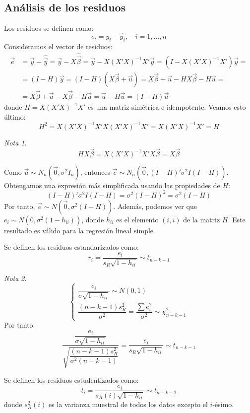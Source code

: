 \documentclass{report}
\theoremstyle{remark}
\theoremstyle{remark}
\newtheorem*{note}{Nota}
\theoremstyle{remark}
\theoremstyle{definition}
\theoremstyle{definition}
\theoremstyle{definition}
\begin{document}
\subsection*{Análisis de los residuos}
Los residuos se definen como:
$$e_i = y_i - \hat{y_i}, \quad i = 1, \dots, n$$
Consideramos el vector de residuos:
\begin{align*}
    \vec{e} & = \vec{y} - \hat{\vec{y}} = \vec{y} - X\hat{\vec{\beta}} = \vec{y} - X(X'X)^{-1}X'\vec{y} = (I - X(X'X)^{-1}X')\vec{y} = \\
            & = (I-H)\vec{y} = (I-H)(X\vec{\beta}+\vec{u}) = X\vec{\beta} + \vec{u} - HX\vec{\beta} - H\vec{u} =                       \\
            & = X\vec{\beta} + \vec{u} - X\vec{\beta} - H\vec{u} = \vec{u} - H\vec{u} = (I-H)\vec{u}
\end{align*}
donde $H = X(X'X)^{-1}X'$ es una matriz simétrica e idempotente.
Veamos esto último:
$$H^2 = X(X'X)^{-1}X'X(X'X)^{-1}X' = X(X'X)^{-1}X' = H$$

\begin{note}
    $$HX\vec{\beta} = X(X'X)^{-1}X'X\vec{\beta} = X\vec{\beta}$$
\end{note}

Como $\vec{u} \sim N_n(\vec{0}, \sigma^2I_n)$, entonces $\vec{e} \sim N_n(\vec{0}, (I-H)'\sigma^2I(I-H))$.
Obtengamos una expresión más simplificada usando las propiedades de $H$:
$$(I-H)'\sigma^2I(I-H) = \sigma^2(I-H)^2 = \sigma^2(I-H)$$
Por tanto, $\vec{e} \sim N(\vec{0}, \sigma^2(I-H))$.
Además, podemos ver que $e_i \sim N(0, \sigma^2(1-h_{ii}))$, donde $h_{ii}$ es el elemento $(i,i)$ de la matriz $H$.
Este resultado es válido para la regresión lineal simple.

Se definen los residuos estandarizados como:
$$r_i = \frac{e_i}{s_R\sqrt{1-h_{ii}}} \sim t_{n-k-1}$$

\begin{note}
    $$\begin{cases}
            \dfrac{e_i}{\sigma\sqrt{1-h_{ii}}} \sim N(0, 1) \\
            \dfrac{(n-k-1)s_R^2}{\sigma^2} = \dfrac{\sum e_i^2}{\sigma^2} \sim \chi^2_{n-k-1}
        \end{cases}$$
    Por tanto:
    $$\frac{\dfrac{e_i}{\sigma\sqrt{1-h_{ii}}}}{\sqrt{\dfrac{(n-k-1)s_R^2}{\sigma^2(n-k-1)}}} = \frac{e_i}{s_R\sqrt{1-h_{ii}}} \sim t_{n-k-1}$$
\end{note}

Se definen los residuos estudentizados como:
$$t_i = \frac{e_i}{s_R(i)\sqrt{1-h_{ii}}} \sim t_{n-k-2}$$
donde $s_R^2(i)$ es la varianza muestral de todos los datos excepto el $i$-ésimo.
\end{document}
